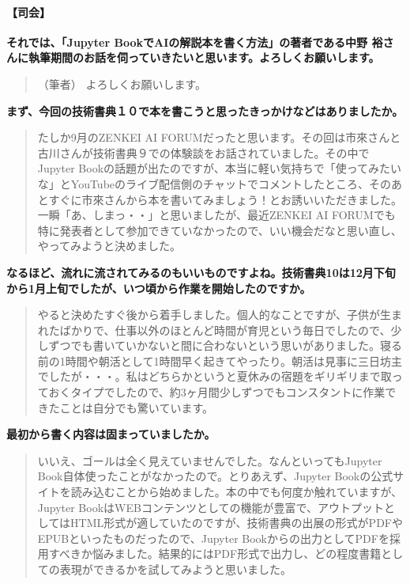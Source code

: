 \documentclass[dvipdfmx,autodetect-engine,10pt,b5paper,papersize,openany,dvipsnames]{jsbook}
\begin{document}
\vspace{0.45cm}

\begin{multicols}{2}

\paragraph{\gtfamily\bfseries 【司会】}
\textbf{それでは、「Jupyter BookでAIの解説本を書く方法」の著者である中野 裕さんに執筆期間のお話を伺っていきたいと思います。よろしくお願いします。}

\begin{quotation}
  \noindent （筆者）
よろしくお願いします。
\end{quotation}


\noindent
\textbf{まず、今回の技術書典１０で本を書こうと思ったきっかけなどはありましたか。}


\begin{quotation}
  \noindent
たしか9月のZENKEI AI FORUMだったと思います。その回は市來さんと古川さんが技術書典９での体験談をお話されていました。その中でJupyter Bookの話題が出たのですが、本当に軽い気持ちで「使ってみたいな」とYouTubeのライブ配信側のチャットでコメントしたところ、そのあとすぐに市來さんから本を書いてみましょう！とお誘いいただきました。一瞬「あ、しまっ・・」と思いましたが、最近ZENKEI AI FORUMでも特に発表者として参加できていなかったので、いい機会だなと思い直し、やってみようと決めました。
\end{quotation}

\noindent
\textbf{なるほど、流れに流されてみるのもいいものですよね。技術書典10は12月下旬から1月上旬でしたが、いつ頃から作業を開始したのですか。}

\begin{quotation}
  \noindent
やると決めたすぐ後から着手しました。個人的なことですが、子供が生まれたばかりで、仕事以外のほとんど時間が育児という毎日でしたので、少しずつでも書いていかないと間に合わないという思いがありました。寝る前の1時間や朝活として1時間早く起きてやったり。朝活は見事に三日坊主でしたが・・・。私はどちらかというと夏休みの宿題をギリギリまで取っておくタイプでしたので、約3ヶ月間少しずつでもコンスタントに作業できたことは自分でも驚いています。
\end{quotation}


\noindent
\textbf{最初から書く内容は固まっていましたか。}


\begin{quotation}
  \noindent
いいえ、ゴールは全く見えていませんでした。なんといってもJupyter Book自体使ったことがなかったので。とりあえず、Jupyter Bookの公式サイトを読み込むことから始めました。本の中でも何度か触れていますが、Jupyter BookはWEBコンテンツとしての機能が豊富で、アウトプットとしてはHTML形式が適していたのですが、技術書典の出展の形式がPDFやEPUBといったものだったので、Jupyter Bookからの出力としてPDFを採用すべきか悩みました。結果的にはPDF形式で出力し、どの程度書籍としての表現ができるかを試してみようと思いました。
\end{quotation}



\end{multicols}
\end{document}
